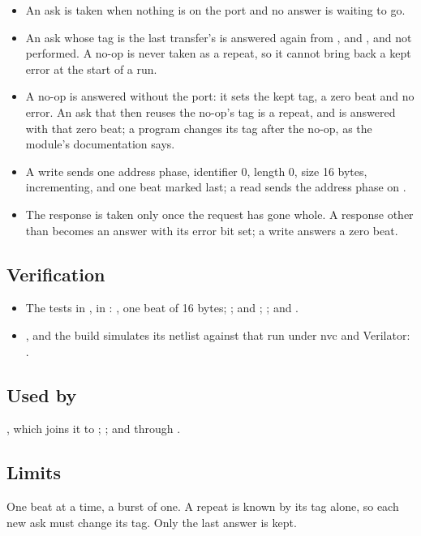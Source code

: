 \begin{itemize}
\item An ask is taken when nothing is on the port and no answer is
waiting to go.
\item An ask whose tag is the last transfer's is answered again from
,  and , and not
performed. A no-op is never taken as a repeat, so it cannot bring back
a kept error at the start of a run.
\item A no-op is answered without the port: it sets the kept tag, a
zero beat and no error. An ask that then reuses the no-op's tag is a
repeat, and is answered with that zero beat; a program changes its tag
after the no-op, as the module's documentation says.
\item A write sends one address phase, identifier 0, length 0, size 16
bytes, incrementing, and one beat marked last; a read sends the address
phase on .
\item The response is taken only once the request has gone whole. A
response other than  becomes an answer with its error bit
set; a write answers a zero beat.
\end{itemize}

\subsection*{Verification}

\begin{itemize}
\item The tests in , in
:
, one beat of 16 bytes;
;
and ;
; and\newline
{}.
\item {}, and the build simulates its
netlist against that run under nvc and Verilator:\newline
{}\newline
{}.
\end{itemize}

\subsection*{Used by}

, which joins it to ; ;
and  through .

\subsection*{Limits}

One beat at a time, a burst of one. A repeat is known by its tag alone,
so each new ask must change its tag. Only the last answer is kept.
